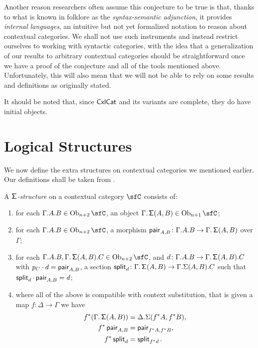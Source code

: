 \begin{rmk}
Another reason researchers often assume this conjecture to be true is that,
thanks to what is known in folklore as the \emph{syntax-semantic adjunction}, it
provides \emph{internal languages}, an intuitive but not yet formalized notation
to reason about contextual categories. We shall not use such instruments
and instead restrict ourselves to working with syntactic categories, with the
idea that a generalization of our results to arbitrary contextual categories
should be straightforward once we have a proof of the conjecture and all of the
tools mentioned above. Unfortunately,
this will also mean that we will not be able to rely on some results and
definitions as originally stated.
\end{rmk}

\begin{rmk}
It should be noted that, since $\operatorname{\mathsf{CxlCat}}$ and its variants are complete, they do
have initial objects.
\end{rmk}

\section{Logical Structures}

We now define the extra structures on contextual categories we mentioned
earlier. Our definitions shall be taken from \cite{KL12,KL18}.

\begin{defn}
  A \emph{$\operatorname{\mathsf{\Sigma}}$-structure} on a contextual category $\sfC$ consists of:
  \begin{enumerate}
    \item for each $\Gamma.A.B\in\Ob_{n+2}\sfC$, an object
      $\Gamma.\Sigmas(A,B)\in\Ob_{n+1}\sfC$;
    \item for each $\Gamma.A.B\in\Ob_{n+2}\sfC$, a morphism $\operatorname{\mathsf{pair}}_{A,B}\colon
      \Gamma.A.B\rightarrow\Gamma.\operatorname{\mathsf{\Sigma}}(A,B)$ over $\Gamma$;
    \item for each $\Gamma.A.B,\Gamma.\Sigmas(A,B).C\in\Ob_{n+2}\sfC$, and
      $d\colon\Gamma.A.B\rightarrow\Gamma.\operatorname{\mathsf{\Sigma}}(A,B).C$ with $p_C\cdot
      d=\operatorname{\mathsf{pair}}_{A,B}$, a section
      $\operatorname{\mathsf{split}}_d\colon\Gamma.\operatorname{\mathsf{\Sigma}}(A,B)\rightarrow\Gamma.\Sigma(A,B).C$ such
      that $\operatorname{\mathsf{split}}_d\cdot\operatorname{\mathsf{pair}}_{A,B}=d$;
    \item where all of the above is compatible with context substitution, that
      is given a map $f\colon\Delta\rightarrow\Gamma$ we have
      \begin{align*}
        f^*(\Gamma.\operatorname{\mathsf{\Sigma}}(A,B)) &=\Delta.\Sigma(f^*A,f^*B), \\
        f^*\operatorname{\mathsf{pair}}_{A,B} &=\operatorname{\mathsf{pair}}_{f^*A,f^*B}, \\
        f^*\operatorname{\mathsf{split}}_d &=\operatorname{\mathsf{split}}_{f^*d}.
      \end{align*}
  \end{enumerate}
\end{defn}

